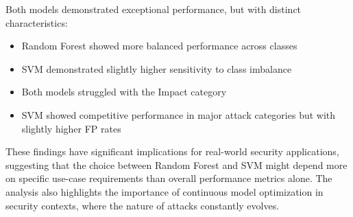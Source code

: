         Both models demonstrated exceptional performance, but with distinct characteristics:
        
        \begin{itemize}
            \item Random Forest showed more balanced performance across classes
            \item SVM demonstrated slightly higher sensitivity to class imbalance
            \item Both models struggled with the Impact category
            \item SVM showed competitive performance in major attack categories but with slightly higher FP rates
        \end{itemize}

        These findings have significant implications for real-world security applications, suggesting that the choice between Random Forest and SVM might depend more on specific use-case requirements than overall performance metrics alone. The analysis also highlights the importance of continuous model optimization in security contexts, where the nature of attacks constantly evolves.
        
        
        
        
        \clearpage

        
